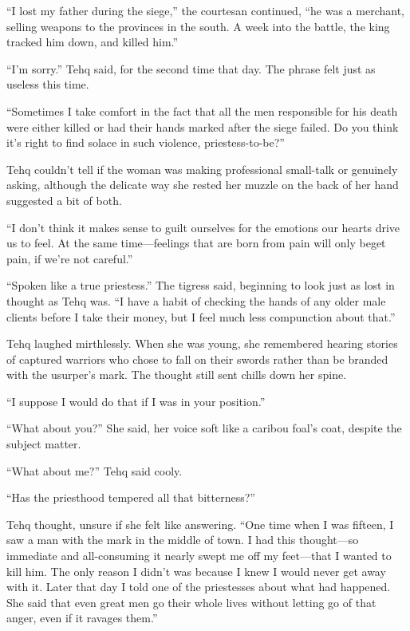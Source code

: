 ``I lost my father during the siege,'' the courtesan continued, ``he was a merchant, selling weapons to the provinces in the south. A week into the battle, the king tracked him down, and killed him.''

``I'm sorry.'' Tehq said, for the second time that day. The phrase felt just as useless this time.

``Sometimes I take comfort in the fact that all the men responsible for his death were either killed or had their hands marked after the siege failed. Do you think it's right to find solace in such violence, priestess-to-be?''

Tehq couldn't tell if the woman was making professional small-talk or genuinely asking, although the delicate way she rested her muzzle on the back of her hand suggested a bit of both.

``I don't think it makes sense to guilt ourselves for the emotions our hearts drive us to feel. At the same time---feelings that are born from pain will only beget pain, if we're not careful.''

``Spoken like a true priestess.'' The tigress said, beginning to look just as lost in thought as Tehq was. ``I have a habit of checking the hands of any older male clients before I take their money, but I feel much less compunction about that.''

Tehq laughed mirthlessly. When she was young, she remembered hearing stories of captured warriors who chose to fall on their swords rather than be branded with the usurper's mark. The thought still sent chills down her spine.

``I suppose I would do that if I was in your position.''

``What about you?'' She said, her voice soft like a caribou foal's coat, despite the subject matter.

``What about me?'' Tehq said cooly.

``Has the priesthood tempered all that bitterness?''

Tehq thought, unsure if she felt like answering. ``One time when I was fifteen, I saw a man with the mark in the middle of town. I had this thought---so immediate and all-consuming it nearly swept me off my feet---that I wanted to kill him. The only reason I didn't was because I knew I would never get away with it. Later that day I told one of the priestesses about what had happened. She said that even great men go their whole lives without letting go of that anger, even if it ravages them.''

